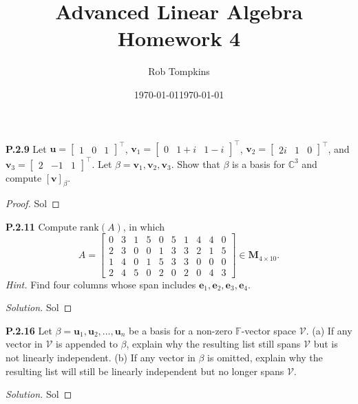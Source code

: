 \documentclass[12pt]{amsart}
\title{Advanced Linear Algebra\\Homework 4}
\author{Rob Tompkins}
\date{\today}
\newenvironment{solution}
{\begin{proof}[Solution]}
{\end{proof}}
\begin{document}
    \maketitle
    \date{\today}
    \begin{onehalfspace}

        \noindent\textbf{P.2.9} Let $\mathbf{u} = [\begin{matrix}1 & 0& 1\end{matrix}]^\top$,
        $\mathbf{v}_1=[\begin{matrix}0 & 1+i& 1-i\end{matrix}]^\top$,
        $\mathbf{v}_2=[\begin{matrix}2i & 1& 0\end{matrix}]^\top$, and
        $\mathbf{v}_3=[\begin{matrix}2 & -1& 1\end{matrix}]^\top$.
        Let $\beta=\mathbf{v}_1,\mathbf{v}_2,\mathbf{v}_3$.
        Show that $\beta$ is a basis for $\mathbb{C}^3$ and compute $[\mathbf{v}]_\beta$.
        \begin{proof}
            Sol
        \end{proof}

        \noindent\textbf{P.2.11} Compute $\text{rank}(A)$, in which
        \begin{displaymath}
            A = \left[\begin{matrix}
                0 & 3 & 1 & 5 & 0 & 5 & 1 & 4 & 4 & 0\\
                2 & 3 & 0 & 0 & 1 & 3 & 3 & 2 & 1 & 5\\
                1 & 4 & 0 & 1 & 5 & 3 & 3 & 0 & 0 & 0\\
                2 & 4 & 5 & 0 & 2 & 0 & 2 & 0 & 4 & 3
            \end{matrix}\right] \in \mathbf{M}_{4\times 10}.
        \end{displaymath}
        \emph{Hint.} Find four columns whose span includes $\mathbf{e}_1, \mathbf{e}_2, \mathbf{e}_3, \mathbf{e}_4$.
        \begin{solution}
            Sol
        \end{solution}

        \noindent\textbf{P.2.16} Let $\beta=\mathbf{u}_1, \mathbf{u}_2, \ldots,\mathbf{u}_n$ be a basis for a non-zero
        $\mathbb{F}$-vector space $\mathcal{V}$.
        (a) If any vector in $\mathcal{V}$ is appended to $\beta$, explain why the resulting list still spans
        $\mathcal{V}$ but is not linearly independent.
        (b) If any vector in $\beta$ is omitted, explain why the resulting list will still be linearly independent but
        no longer spans $\mathcal{V}$.
        \begin{solution}
            Sol
        \end{solution}


\end{onehalfspace}
\end{document}
